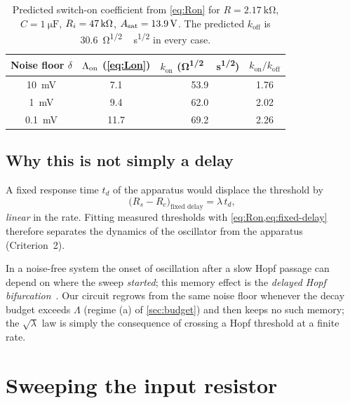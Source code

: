 \begin{table}[!htb]
  \centering
  \small
  \begin{tabular}{@{}cccc@{}}
    \toprule
    Noise floor $\delta$ & $\Lambda_{\mathrm{on}}$ (\cref{eq:Lon}) & $k_{\mathrm{on}}$ (\si{\ohm^{1/2}\,\second^{1/2}}) & $k_{\mathrm{on}}/k_{\mathrm{off}}$ \\
    \midrule
    \SI{10}{\milli\volt}  & 7.1  & 53.9 & 1.76 \\
    \SI{1}{\milli\volt}   & 9.4  & 62.0 & 2.02 \\
    \SI{0.1}{\milli\volt} & 11.7 & 69.2 & 2.26 \\
    \bottomrule
  \end{tabular}
  \caption[Predicted switch-on coefficient]{Predicted switch-on coefficient from \cref{eq:Ron} for
  $R=\SI{2.17}{\kilo\ohm}$, $C=\SI{1}{\micro\farad}$, $R_{i}=\SI{47}{\kilo\ohm}$, $A_{\mathrm{sat}}=\SI{13.9}{\volt}$.
  The predicted $k_{\mathrm{off}}$ is \SI{30.6}{\ohm^{1/2}\,\second^{1/2}} in every case.}
  \label{tab:kon}
\end{table}

\subsection{Why this is not simply a delay}\label{sec:not-delay}

A fixed response time $t_{d}$ of the apparatus would displace the threshold by
\begin{equation}
  \bigl(R_{s}-R_{c}\bigr)_{\text{fixed delay}} = \lambda\,t_{d} ,
  \label{eq:fixed-delay}
\end{equation}
\emph{linear} in the rate. Fitting measured thresholds with \cref{eq:Ron,eq:fixed-delay} therefore
separates the dynamics of the oscillator from the apparatus (Criterion~2).

\begin{whybox}[Terminology]
In a noise-free system the onset of oscillation after a slow Hopf passage can depend on where the sweep
\emph{started}; this memory effect is the \emph{delayed Hopf bifurcation}~\cite{Baer1989}. Our circuit
regrows from the same noise floor whenever the decay budget exceeds $\Lambda$ (regime (a) of
\cref{sec:budget}) and then keeps no such memory; the $\sqrt{\lambda}$ law is simply the consequence of
crossing a Hopf threshold at a finite rate.
\end{whybox}

\section{Sweeping the input resistor}\label{sec:ri-sweep}

